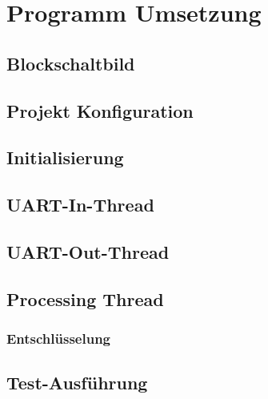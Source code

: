 \newpage
\section{Programm Umsetzung}
\subsection{Blockschaltbild}
\subsection{Projekt Konfiguration}
\subsection{Initialisierung}
\subsection{UART-In-Thread}
\subsection{UART-Out-Thread}
\subsection{Processing Thread}
\subsubsection{Entschlüsselung}

\subsection{Test-Ausführung}